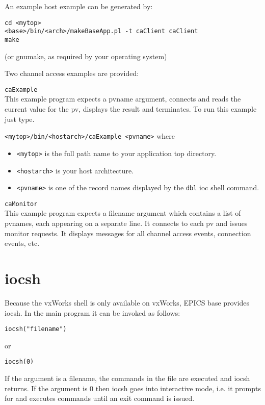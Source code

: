 An example host example can be generated by:

\begin{verbatim}
cd <mytop>
<base>/bin/<arch>/makeBaseApp.pl -t caClient caClient
make
\end{verbatim}
(or gnumake, as required by your operating system)

Two channel access examples are provided:

\begin{description}
\item \verb|caExample| \\
This example program expects a pvname argument, connects and reads the current value for the pv, displays the result 
and terminates. To run this example just type.

\verb|<mytop>/bin/<hostarch>/caExample <pvname>|  where

\begin{itemize}
\item \verb|<mytop>| is the full path name to your application top directory.

\item \verb|<hostarch>| is your host architecture.

\item \verb|<pvname>| is one of the record names displayed by the \verb|dbl| ioc shell command.
\end{itemize}

\item \verb|caMonitor| \\
This example program expects a filename argument which contains a list of pvnames, each appearing on a separate line.
It connects to each pv and issues monitor requests. It displays messages for all channel access events, connection 
events, etc.
\end{description}

\section{iocsh}

Because the vxWorks shell is only available on vxWorks, EPICS base provides iocsh. In the main program it can be 
invoked as follows:

\begin{verbatim}
iocsh("filename")
\end{verbatim}
or
\begin{verbatim}
iocsh(0)
\end{verbatim}
If the argument is a filename, the commands in the file are executed and iocsh returns. If the argument is 0 then iocsh goes 
into interactive mode, i.e. it prompts for and executes commands until an exit command is issued.


